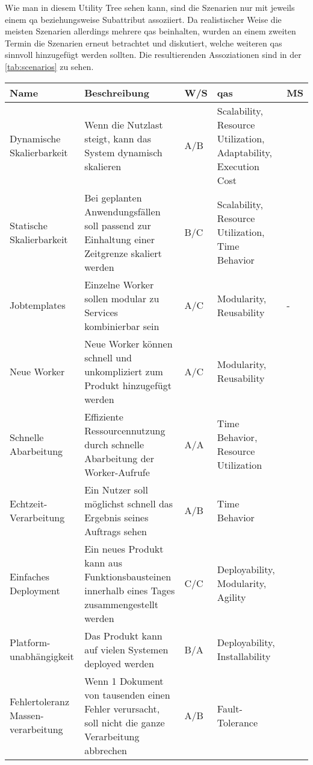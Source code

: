 Wie man in diesem Utility Tree sehen kann, sind die Szenarien nur mit jeweils einem \gls{qa} beziehungsweise Subattribut assoziiert.
Da realistischer Weise die meisten Szenarien allerdings mehrere \glspl{qa} beinhalten, wurden an einem zweiten Termin die Szenarien erneut betrachtet und diskutiert, welche weiteren \glspl{qa} sinnvoll hinzugefügt werden sollten.
Die resultierenden Assoziationen sind in der \cref{tab:scenarios} zu sehen.

\begin{table}
	\centering
	\begin{tabular}{ m{} m{6cm} m{0.7cm} m{} p{0.7cm} }
		\toprule
		\textbf{Name} & \textbf{Beschreibung} & \textbf{W/S} & \textbf{\glspl{qa}} & \textbf{MS} \\
		\midrule
		Dynamische Skalierbarkeit & Wenn die Nutzlast steigt, kann das System dynamisch skalieren & A/B & Scalability, Resource Utilization, Adaptability, Execution Cost & \advantage \\ \hline
		Statische Skalierbarkeit & Bei geplanten Anwendungsfällen soll passend zur Einhaltung einer Zeitgrenze skaliert werden & B/C & Scalability, Resource Utilization, Time Behavior & \advantage \\  \hline
		 Jobtemplates& Einzelne Worker sollen modular zu Services kombinierbar sein & A/C & Modularity, Reusability & - \\ \hline
		 Neue Worker& Neue Worker können schnell und unkompliziert zum Produkt hinzugefügt werden & A/C & Modularity, Reusability & \advantage  \\ \hline
		 Schnelle Abarbeitung & Effiziente Ressourcennutzung durch schnelle Abarbeitung der Worker-Aufrufe  & A/A & Time Behavior, Resource Utilization & \disadvantage \\ \hline
		 \glqq Echtzeit\grqq{}-Verarbeitung & Ein Nutzer soll möglichst schnell das Ergebnis seines Auftrags sehen & A/B & Time Behavior & \disadvantage \\ \hline
		 Einfaches Deployment & Ein neues Produkt kann aus Funktionsbausteinen innerhalb eines Tages zusammengestellt werden &C/C & Deployability, Modularity, Agility & \disadvantage \\ \hline
		 Platform-unabhängigkeit& Das Produkt kann auf vielen Systemen deployed werden & B/A & Deployability, Installability & \advantage \\ \hline
		 Fehlertoleranz Massen-verarbeitung & Wenn 1 Dokument von tausenden einen Fehler verursacht, soll nicht die ganze Verarbeitung abbrechen & A/B & Fault-Tolerance &\advantage \\ \hline

\end{tabular}
\end{table}
